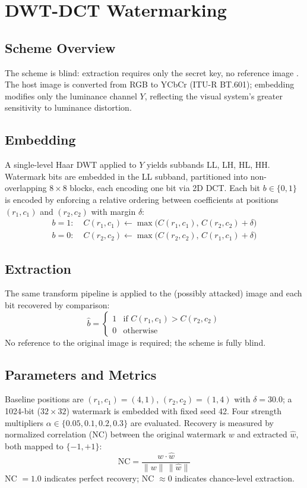 \documentclass[conference]{IEEEtran}
\begin{document}
\section{DWT-DCT Watermarking}
\label{sec:background}

\subsection{Scheme Overview}
The scheme is blind: extraction requires only the secret key, no
reference image \cite{cox2007}. The host image is converted from RGB to
YCbCr (ITU-R BT.601); embedding modifies only the luminance channel $Y$,
reflecting the visual system's greater sensitivity to luminance distortion.

\subsection{Embedding}
A single-level Haar DWT applied to $Y$ yields subbands LL, LH, HL, HH.
Watermark bits are embedded in the LL subband, partitioned into
non-overlapping $8\times8$ blocks, each encoding one bit via 2D DCT.
Each bit $b \in \{0,1\}$ is encoded by enforcing a relative ordering
between coefficients at positions $(r_1,c_1)$ and $(r_2,c_2)$ with
margin $\delta$:
\begin{align}
b=1:\; & C(r_1,c_1) \leftarrow \max\!\big(C(r_1,c_1),\, C(r_2,c_2)+\delta\big) \\
b=0:\; & C(r_2,c_2) \leftarrow \max\!\big(C(r_2,c_2),\, C(r_1,c_1)+\delta\big)
\end{align}

\subsection{Extraction}
The same transform pipeline is applied to the (possibly attacked) image
and each bit recovered by comparison:
\begin{equation}
\hat{b} =
\begin{cases}
1 & \text{if } C(r_1,c_1) > C(r_2,c_2) \\
0 & \text{otherwise}
\end{cases}
\end{equation}
No reference to the original image is required; the scheme is fully blind.

\subsection{Parameters and Metrics}
Baseline positions are $(r_1,c_1)=(4,1)$, $(r_2,c_2)=(1,4)$ with
$\delta=30.0$; a 1024-bit ($32\times32$) watermark is embedded with
fixed seed 42.
Four strength multipliers $\alpha \in \{0.05, 0.1, 0.2, 0.3\}$ are
evaluated. Recovery is measured by normalized correlation (NC) between
the original watermark $w$ and extracted $\hat{w}$, both mapped to
$\{-1,+1\}$:
\begin{equation}
\mathrm{NC} = \frac{w \cdot \hat{w}}{\lVert w \rVert\, \lVert \hat{w} \rVert}
\end{equation}
NC $= 1.0$ indicates perfect recovery; NC $\approx 0$ indicates
chance-level extraction.
\end{document}
